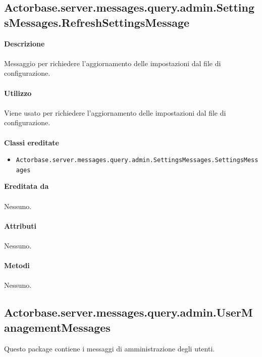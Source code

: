 \documentclass[a4paper]{article}
\begin{document}
	\subsection{Actorbase.server.messages.query.admin.SettingsMessages.RefreshSettingsMessage}
		\textbf{Descrizione}
			\\ \\
			Messaggio per richiedere l'aggiornamento delle impostazioni dal file di configurazione.
			\\ \\
		\textbf{Utilizzo}
			\\ \\
			Viene usato per richiedere l'aggiornamento delle impostazioni dal file di configurazione.
			\\ \\
		\textbf{Classi ereditate}
			\begin{itemize}
				\item \texttt{Actorbase.server.messages.query.admin.SettingsMessages.SettingsMessages}
			\end{itemize}
		\textbf{Ereditata da}
			\\ \\
			Nessuno.
			\\ \\
		\textbf{Attributi}
			\\ \\
			Nessuno.
			\\ \\
		\textbf{Metodi}
			\\ \\
			Nessuno.
			
	\subsection{Actorbase.server.messages.query.admin.UserManagementMessages}
		Questo package contiene i messaggi di amministrazione degli utenti.
		
\end{document}
